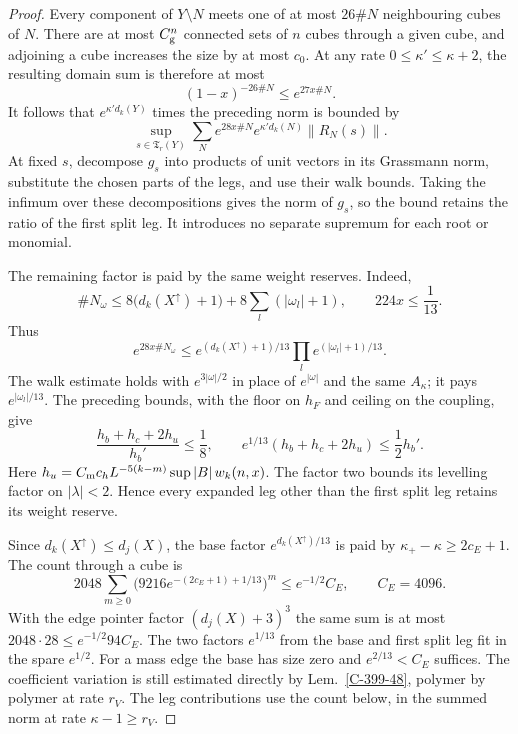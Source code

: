 \documentclass[11pt,letterpaper,reqno]{amsart}
\theoremstyle{definition}
\theoremstyle{remark}
\begin{document}
\begin{proof}
Every component of $Y\setminus N$ meets one of at most
$26\#N$ neighbouring cubes of $N$. There are at most
$C_{\rm g}^n$ connected sets of $n$ cubes through a given
cube, and adjoining a cube increases the size by at most
$c_0$. At any rate $0\le\kappa'\le\kappa+2$, the resulting
domain sum is therefore at most
\[
 (1-x)^{-26\#N}\le e^{27x\#N}.
\]
It follows that $e^{\kappa'd_k(Y)}$ times the preceding
norm is bounded by
\[
 \sup_{s\in\mathfrak T_r(Y)}
       \sum_N e^{28x\#N}e^{\kappa'd_k(N)}\|R_N(s)\|.
\]
At fixed $s$, decompose $g_s$ into products of unit
vectors in its Grassmann norm, substitute the chosen
parts of the legs, and use their walk bounds. Taking
the infimum over these decompositions gives the norm
of $g_s$, so the bound retains the ratio of the first
split leg. It introduces no separate supremum for each
root or monomial.

The remaining factor is paid by the same weight reserves.
Indeed,
\[
 \#N_\omega\le8\bigl(d_k(X^\uparrow)+1\bigr)
                  +8\sum_l(|\omega_l|+1),\qquad
 224x\le\frac1{13}.
\]
Thus
\[
 e^{28x\#N_\omega}
 \le e^{(d_k(X^\uparrow)+1)/13}
                    \prod_l e^{(|\omega_l|+1)/13}.
\]
The walk estimate holds with $e^{3|\omega|/2}$ in place
of $e^{|\omega|}$ and the same $A_\kappa$; it pays
$e^{|\omega_l|/13}$. The preceding bounds, with the
floor on $h_F$ and ceiling on the coupling, give
\[
 \frac{h_b+h_c+2h_u}{h_b'}\le\frac18,
 \qquad e^{1/13}(h_b+h_c+2h_u)\le\frac12h_b'.
\]
Here $h_u=C_{\rm m}c_hL^{-5(k-m)}\sup|B|\,w_k(n,x)$.
The factor two bounds its levelling factor on
$|\lambda|<2$. Hence every expanded leg other than
the first split leg retains its weight reserve.

Since $d_k(X^\uparrow)\le d_j(X)$, the base factor
$e^{d_k(X^\uparrow)/13}$ is paid by
$\kappa_+-\kappa\ge2c_E+1$. The count through a cube is
\[
 2048\sum_{m\ge0}
    \bigl(9216e^{-(2c_E+1)+1/13}\bigr)^m
       \le e^{-1/2}C_E,\qquad C_E=4096.
\]
With the edge pointer factor $(d_j(X)+3)^3$ the same
sum is at most $2048\cdot28\le e^{-1/2}94C_E$.
The two factors $e^{1/13}$ from the base and first
split leg fit in the spare $e^{1/2}$. For a mass edge
the base has size zero and $e^{2/13}<C_E$ suffices.
The coefficient variation is still estimated directly
by Lem.~\ref{C-399-48}, polymer by polymer at rate $r_V$.
The leg contributions use the count below, in the summed
norm at rate $\kappa-1\ge r_V$.


\end{proof}
\end{document}
